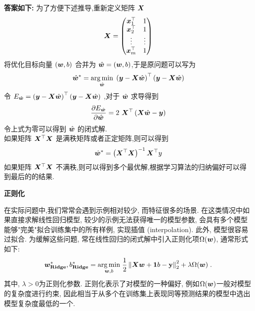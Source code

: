 \documentclass[answers]{exam}  %
\begin{document}
\begin{questions}
	\begin{solution}
		\begin{description}
			\item \textbf{答案如下:}
			      为了方便下述推导,重新定义矩阵 $\boldsymbol{X}$\\
			      \begin{equation*}
				      \boldsymbol{X} = \begin{pmatrix}
					      {\boldsymbol{x}}_1^\top & 1      \\
					      {\boldsymbol{x}}_2^\top & 1      \\
					      \vdots     & \vdots \\
					      {\boldsymbol{x}}_m^\top & 1
				      \end{pmatrix}
			      \end{equation*}
			      将优化目标向量 $(\boldsymbol{w},b)$ 合并为 $\hat {\boldsymbol{w}}=(\boldsymbol{w},b)$,于是原问题可以写为
			      \begin{equation*}
				      \hat{\boldsymbol{w}}^*=\underset{\hat{\boldsymbol{w}}}{\arg \min }\; \left(\boldsymbol{y} -\boldsymbol{X} \hat{\boldsymbol{w}}\right)^\top \left(\boldsymbol{y} -\boldsymbol{X} \hat{\boldsymbol{w}}\right)
			      \end{equation*}
			      令 $E_{\hat{\boldsymbol{w}}}=\left(\boldsymbol{y} -\boldsymbol{X} \hat{\boldsymbol{w}}\right)^\top \left(\boldsymbol{y} -\boldsymbol{X} \hat{\boldsymbol{w}}\right)$ ,对于 $\hat{\boldsymbol{w}}$ 求导得到
			      \begin{equation*}
				      \frac{\partial E_{\hat\vw}}{\partial \hat\vw}=2\ \mX^\top\left(\mX \hat\vw-\vy\right)
			      \end{equation*}
			      令上式为零可以得到 $\hat{\boldsymbol{w}}$ 的闭式解.\\
			      如果矩阵 $\boldsymbol{X}^\top\boldsymbol{X}$ 是满秩矩阵或者正定矩阵,则可以得到
			      \begin{equation*}
				      \hat{\boldsymbol{w}}^*=\left(\boldsymbol{X}^\top\boldsymbol{X}\right)^{-1}\boldsymbol{X}^\top y
			      \end{equation*}
			      如果矩阵 $\boldsymbol{X}^\top\boldsymbol{X}$ 不满秩,则可以得到多个最优解,根据学习算法的归纳偏好可以得到最后的的结果.
		\end{description}
	\end{solution}


	\question [25] \textbf{正则化}

	在实际问题中,我们常常会遇到示例相对较少, 而特征很多的场景. 在这类情况中如果直接求解线性回归模型, 较少的示例无法获得唯一的模型参数, 会具有多个模型能够"完美"拟合训练集中的所有样例, 实现插值 (interpolation). 此外, 模型很容易过拟合. 为缓解这些问题, 常在线性回归的闭式解中引入正则化项$\Omega(\boldsymbol{w})$, 通常形式如下:
	\begin{equation}
		\boldsymbol{w}_{\mathbf{Ridge}}^{*}, b_{\mathbf{Ridge}}^{*}=\underset{\boldsymbol{w}, b}{\arg \min }\; \frac{1}{2}\left\|\boldsymbol{X} \boldsymbol{w}+\boldsymbol{1} b-\mathbf{y}\right\|_{2}^{2}+\lambda \Omega(\boldsymbol{w})  \label{eq:ls-regular}\;.
	\end{equation}
	其中, $\lambda > 0$为正则化参数. 正则化表示了对模型的一种偏好, 例如$\Omega(\boldsymbol{w})$一般对模型的复杂度进行约束, 因此相当于从多个在训练集上表现同等预测结果的模型中选出模型复杂度最低的一个.


\end{questions}
\end{document}
